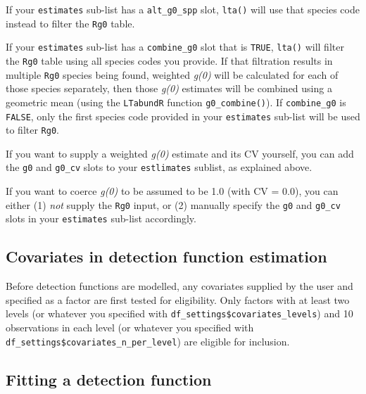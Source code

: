 \documentclass[
]{book}
\begin{document}
If your \texttt{estimates} sub-list has a \texttt{alt\_g0\_spp} slot, \texttt{lta()} will use that species code instead to filter the \texttt{Rg0} table.

If your \texttt{estimates} sub-list has a \texttt{combine\_g0} slot that is \texttt{TRUE}, \texttt{lta()} will filter the \texttt{Rg0} table using all species codes you provide. If that filtration results in multiple \texttt{Rg0} species being found, weighted \emph{g(0)} will be calculated for each of those species separately, then those \emph{g(0)} estimates will be combined using a geometric mean (using the \texttt{LTabundR} function \texttt{g0\_combine()}). If \texttt{combine\_g0} is \texttt{FALSE}, only the first species code provided in your \texttt{estimates} sub-list will be used to filter \texttt{Rg0}.

If you want to supply a weighted \emph{g(0)} estimate and its CV yourself, you can add the \texttt{g0} and \texttt{g0\_cv} slots to your \texttt{estlimates} sublist, as explained above.

If you want to coerce \emph{g(0)} to be assumed to be 1.0 (with CV = 0.0), you can either (1) \emph{not} supply the \texttt{Rg0} input, or (2) manually specify the \texttt{g0} and \texttt{g0\_cv} slots in your \texttt{estimates} sub-list accordingly.

\hypertarget{covariates-in-detection-function-estimation}{%
\subsection*{Covariates in detection function estimation}\label{covariates-in-detection-function-estimation}}

Before detection functions are modelled, any covariates supplied by the user and specified as a factor are first tested for eligibility. Only factors with at least two levels (or whatever you specified with \texttt{df\_settings\$covariates\_levels}) and 10 observations in each level (or whatever you specified with \texttt{df\_settings\$covariates\_n\_per\_level}) are eligible for inclusion.

\hypertarget{fitting-a-detection-function}{%
\subsection*{Fitting a detection function}\label{fitting-a-detection-function}}
\end{document}
